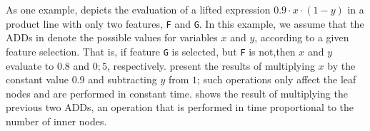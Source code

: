 As one example,  depicts the evaluation of a lifted expression $0.9 \cdot x \cdot (1 - y)$ in a product line with only two features, \texttt{F} and \texttt{G}.
In this example, we assume that the ADDs in  denote the possible values for variables $x$ and $y$, according to a given feature selection.
That is, if feature \texttt{G} is selected, but \texttt{F} is not,then $x$ and $y$ evaluate to $0.8$ and $0;5$, respectively.
 present the results of multiplying $x$ by the constant value $0.9$ and subtracting $y$ from $1$; such operations only affect the leaf nodes and are performed in constant time.
 shows the result of multiplying the previous two ADDs, an operation that is performed in time proportional to the number of inner nodes.

